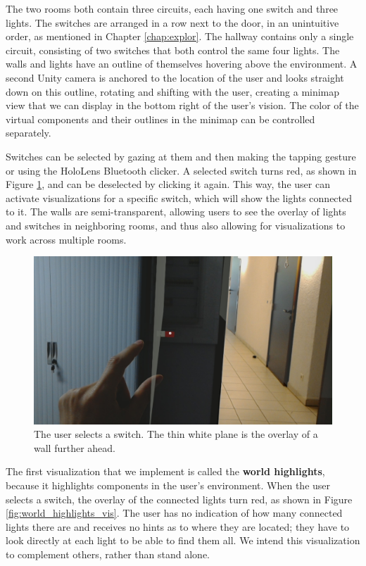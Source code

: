 The two rooms both contain three circuits, each having one switch and three lights. The switches are arranged in a row next to the door, in an unintuitive order, as mentioned in Chapter \ref{chap:explor}. The hallway contains only a single circuit, consisting of two switches that both control the same four lights. The walls and lights have an outline of themselves hovering above the environment. A second Unity camera is anchored to the location of the user and looks straight down on this outline, rotating and shifting with the user, creating a minimap view that we can display in the bottom right of the user's vision. The color of the virtual components and their outlines in the minimap can be controlled separately.

Switches can be selected by gazing at them and then making the tapping gesture or using the HoloLens Bluetooth clicker. A selected switch turns red, as shown in Figure \ref{fig:selection}, and can be deselected by clicking it again. This way, the user can activate visualizations for a specific switch, which will show the lights connected to it. The walls are semi-transparent, allowing users to see the overlay of lights and switches in neighboring rooms, and thus also allowing for visualizations to work across multiple rooms.

\begin{figure}
    \centering
    \includegraphics[width=1.0\linewidth]{resources/implementation/selection.jpg}
    \caption{The user selects a switch. The thin white plane is the overlay of a wall further ahead.}
    \label{fig:selection}
\end{figure}

The first visualization that we implement is called the \textbf{world highlights}, because it highlights components in the user's environment. When the user selects a switch, the overlay of the connected lights turn red, as shown in Figure \ref{fig:world_highlights_vis}. The user has no indication of how many connected lights there are and receives no hints as to where they are located; they have to look directly at each light to be able to find them all. We intend this visualization to complement others, rather than stand alone.

